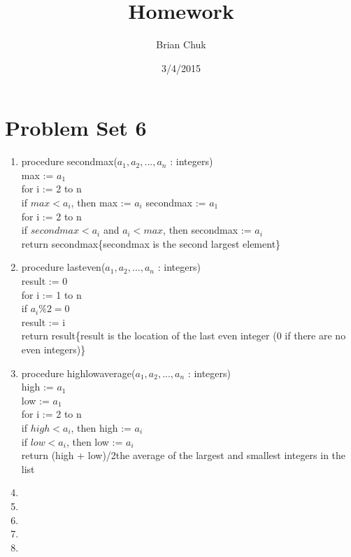 \documentclass[11pt]{article}
\title{\textbf{Homework}}
\author{Brian Chuk}
\date{3/4/2015}
\begin{document}
\maketitle

\section{Problem Set 6}
\begin{enumerate}
\item procedure secondmax($a_1 , a_2 , . . . , a_n$ : integers)
	\\max := $a_1$
	\\for i := 2 to n
	\\ \hspace*{20 pt}if $max <a_i$, then max := $a_i$
	secondmax := $a_1$
	\\for i := 2 to n
	\\ \hspace*{20 pt}if $secondmax < a_i$ and $a_i < max$, then secondmax := $a_i$
	\\return secondmax\{secondmax is the second largest element\}
\item procedure lasteven($a_1 , a_2 , . . . , a_n$ : integers)
	\\result := 0
	\\for i := 1 to n
	\\ \hspace*{20 pt}if $a_i \% 2 = 0$
	\\ \hspace*{40 pt}result := i
	\\return result\{result is the location of the last even integer (0 if there are no even integers)\}
\item procedure highlowaverage($a_1 , a_2 , . . . , a_n$ : integers)
	\\high := $a_1$
	\\low := $a_1$
	\\for i := 2 to n
	\\\hspace*{20 pt}if $high <a_i$, then high := $a_i$
	\\\hspace*{20 pt}if $low <a_i$, then low := $a_i$
	\\return (high + low)/2{the average of the largest and smallest integers in the list}	
\item 
\item 
\item 
\item 
\item 

\end{enumerate}
\end{document}
